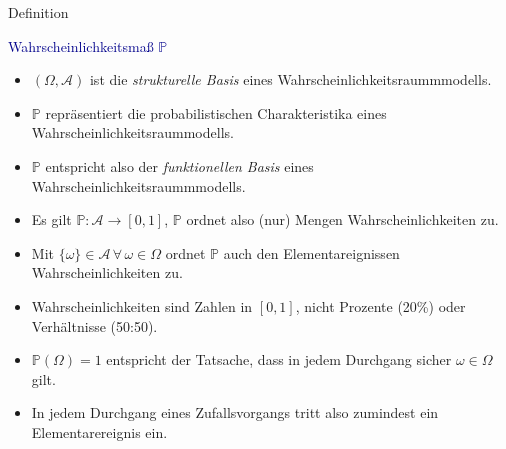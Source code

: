 \documentclass[
  8pt,
  ignorenonframetext,
]{beamer}
\providecommand{\tightlist}{%
  \setlength{\itemsep}{0pt}\setlength{\parskip}{0pt}}
\begin{document}
\begin{frame}{Definition}
\protect\hypertarget{definition-7}{}

\textcolor{darkblue}{Wahrscheinlichkeitsmaß $\mathbb{P}$}

\small

\begin{itemize}
\tightlist
\item
  \justifying \((\Omega,\mathcal{A})\) ist die \emph{strukturelle Basis}
  eines Wahrscheinlichkeitsraummmodells.
\item
  \(\mathbb{P}\) repräsentiert die probabilistischen Charakteristika
  eines Wahrscheinlichkeitsraummodells.
\item
  \(\mathbb{P}\) entspricht also der \emph{funktionellen Basis} eines
  Wahrscheinlichkeitsraummmodells.
\item
  Es gilt \(\mathbb{P}: \mathcal{A} \to [0,1]\), \(\mathbb{P}\) ordnet
  also (nur) Mengen Wahrscheinlichkeiten zu.
\item
  Mit \(\{\omega\} \in \mathcal{A}\, \forall\, \omega \in \Omega\)
  ordnet \(\mathbb{P}\) auch den Elementareignissen Wahrscheinlichkeiten
  zu.
\item
  Wahrscheinlichkeiten sind Zahlen in \([0,1]\), nicht Prozente (20\%)
  oder Verhältnisse (50:50).
\item
  \(\mathbb{P}(\Omega) = 1\) entspricht der Tatsache, dass in jedem
  Durchgang sicher \(\omega \in \Omega\) gilt.
\item
  In jedem Durchgang eines Zufallsvorgangs tritt also zumindest ein
  Elementarereignis ein.
\end{itemize}
\end{frame}
\end{document}
